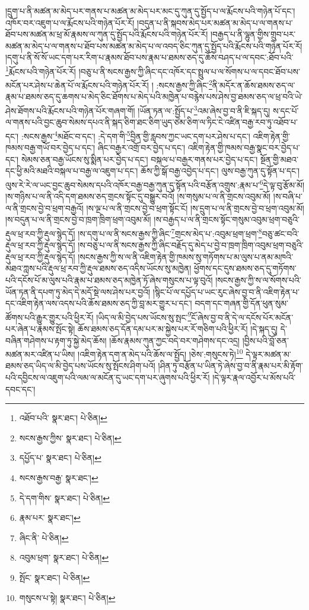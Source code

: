 །དྲུག་པ་ནི་མཚན་མ་མེད་པར་གནས་པ་མཚན་མ་མེད་པར་མང་དུ་ཀུན་དུ་སྤྱོད་པ་ལ་རྨོངས་པའི་གཉེན་པོ་དང་། འཁོར་བར་འཇུག་པ་ལ་རྨོངས་པའི་གཉེན་པོར་རོ། །བདུན་པ་ནི་སྐབས་མེད་པར་མཚན་མ་མེད་པ་ལ་གནས་པ་ཐོབ་པས་མཚན་མ་ཕྲ་མོ་རྣམས་ལ་ཀུན་དུ་སྤྱོད་པའི་རྨོངས་པའི་གཉེན་པོར་རོ། །བརྒྱད་པ་ནི་ལྷུན་གྱིས་གྲུབ་པར་མཚན་མ་མེད་པ་ལ་གནས་པ་ཐོབ་པས་མཚན་མ་མེད་པ་ལ་འབད་ཅིང་ཀུན་དུ་སྤྱོད་པའི་རྨོངས་པའི་གཉེན་པོར་རོ། །དགུ་པ་ནི་སོ་སོ་ཡང་དག་པར་རིག་པ་རྣམས་ཐོབ་པས་རྣམ་པ་ཐམས་ཅད་དུ་ཆོས་བཤད་པ་ལ་དབང་:ཐོབ་པའི་\footnote{འཐོབ་པའི་  སྣར་ཐང་།  པེ་ཅིན། }རྨོངས་པའི་གཉེན་པོར་རོ། །བཅུ་པ་ནི་སངས་རྒྱས་ཀྱི་ཞིང་དང་འཁོར་དང་སྤྲུལ་པ་ལ་སོགས་པ་ལ་དབང་ཐོབ་པས་མངོན་པར་ཤེས་པ་ཆེན་པོ་ལ་རྨོངས་པའི་གཉེན་པོར་རོ། །
:སངས་རྒྱས་ཀྱི་ཞིང་\footnote{སངས་རྒྱས་ཀྱིས་  སྣར་ཐང་།  པེ་ཅིན། }ནི་མདོར་ན་ཆོས་ཐམས་ཅད་ལ་རྣམ་པ་ཐམས་ཅད་དུ་ཆགས་པ་མེད་ཅིང་ཐོགས་པ་མེད་པའི་མཁྱེན་པ་བརྙེས་པས་ཤེས་བྱ་ཐམས་ཅད་ལ་ཕྲ་བའི་ཡེ་ཤེས་ཐོགས་པའི་རྨོངས་པའི་གཉེན་པོར་གཞག་གོ། །ཡོན་ཏན་ལ་:སྤྱོད་པ་\footnote{དཔྱོད་པ་  སྣར་ཐང་།  པེ་ཅིན། }འམ་ཞེས་བྱ་བ་ནི་ཇི་སྐད་དུ། ས་དང་པོ་ལ་གནས་པའི་བྱང་ཆུབ་སེམས་དཔའ་ནི་སྐད་ཅིག་ཐང་ཅིག་ཡུད་ཙམ་ཅིག་ལ་ཏིང་ངེ་འཛིན་བརྒྱ་རབ་ཏུ་འཐོབ་པ་དང་། :སངས་རྒྱས་\footnote{སངས་རྒྱས་བརྒྱ་  སྣར་ཐང་། }མཐོང་བ་དང་། :དེ་དག་གི་\footnote{དེ་དག་གིས་  སྣར་ཐང་།  པེ་ཅིན། }བྱིན་གྱི་རླབས་ཀྱང་ཡང་དག་པར་ཤེས་པ་དང་། འཇིག་རྟེན་གྱི་ཁམས་བརྒྱ་གཡོ་བར་བྱེད་པ་དང་། ཞིང་བརྒྱར་འགྲོ་བར་བྱེད་པ་དང་། འཇིག་རྟེན་གྱི་ཁམས་བརྒྱ་སྣང་བར་བྱེད་པ་དང་། སེམས་ཅན་བརྒྱ་ཡོངས་སུ་སྨིན་པར་བྱེད་པ་དང་། བསྐལ་པ་བརྒྱར་གནས་པར་བྱེད་པ་དང་། སྔོན་གྱི་མཐའ་དང་ཕྱི་མའི་མཐའི་བསྐལ་པ་བརྒྱ་ལ་འཇུག་པ་དང་། ཆོས་ཀྱི་སྒོ་བརྒྱ་འབྱེད་པ་དང་། ལུས་བརྒྱ་ཀུན་དུ་སྟོན་པ་དང་། ལུས་རེ་རེ་ལ་ཡང་བྱང་ཆུབ་སེམས་དཔའི་འཁོར་བརྒྱ་བརྒྱ་ཀུན་དུ་སྟོན་པའི་བརྩོན་འགྲུས་:རྣམ་པ་\footnote{རྣམ་པར་  སྣར་ཐང་། }དེ་ལྟ་བུ་རྩོམ་མོ། །ས་གཉིས་པ་ལ་ནི་འདི་དག་ཐམས་ཅད་གྲངས་སྟོང་དུ་བསྒྱུར་བའོ། །ས་གསུམ་པ་ལ་ནི་གྲངས་འབུམ་མོ། །ས་བཞི་པ་ལ་ནི་གྲངས་བྱེ་བ་ཕྲག་བརྒྱའོ། །ས་ལྔ་པ་ལ་ནི་གྲངས་བྱེ་བ་ཕྲག་སྟོང་ངོ། །ས་དྲུག་པ་ལ་ནི་གྲངས་བྱེ་བ་ཕྲག་འབུམ་མོ། །ས་བདུན་པ་ལ་ནི་གྲངས་བྱེ་བ་ཁྲག་ཁྲིག་ཕྲག་འབུམ་མོ། །ས་བརྒྱད་པ་ལ་ནི་གྲངས་སྟོང་གསུམ་འབུམ་ཕྲག་བཅུའི་རྡུལ་ཕྲ་རབ་ཀྱི་རྡུལ་སྙེད་དོ། །ས་དགུ་པ་ལ་ནི་སངས་རྒྱས་ཀྱི་ཞིང་\footnote{ཞིང་ནི་  པེ་ཅིན། }གྲངས་མེད་པ་:འབུམ་ཕྲག་ཕྲག་\footnote{འབུམ་ཕྲག་  སྣར་ཐང་།  པེ་ཅིན། }བཅུ་ཚང་བའི་རྡུལ་ཕྲ་རབ་ཀྱི་རྡུལ་སྙེད་དོ། །ས་བཅུ་པ་ལ་ནི་སངས་རྒྱས་ཀྱི་ཞིང་བརྗོད་དུ་མེད་པ་བྱེ་བ་ཁྲག་ཁྲིག་འབུམ་ཕྲག་བཅུའི་རྡུལ་ཕྲ་རབ་ཀྱི་རྡུལ་སྙེད་དོ། །སངས་རྒྱས་ཀྱི་ས་ལ་ནི་འཇིག་རྟེན་གྱི་ཁམས་སུ་གཏོགས་པ་མ་ལུས་པ་ནམ་མཁའི་མཐའ་ཀླས་པའི་རྡུལ་ཕྲ་རབ་ཀྱི་རྡུལ་ཐམས་ཅད་འདིས་ཡོངས་སུ་མཁྱེན། ཕྱོགས་དང་དུས་ཐམས་ཅད་དུ་གཏོགས་པའི་དངོས་པོ་མ་ལུས་པའི་རྣམ་པ་ཐམས་ཅད་མཁྱེན་ཏོ་ཞེས་གསུངས་པ་ལྟ་བུའོ། །སངས་རྒྱས་ཀྱི་ས་ལ་སོགས་པའི་ཡོན་ཏན་ནི་དཔག་ཏུ་མེད་དེ་མདོ་སྡེ་ལས་ཤེས་པར་བྱའོ། །སྙིང་པོ་ལ་དཔྱོད་པ་ཡང་རུང་ཞེས་བྱ་བ་ནི་འཇིག་རྟེན་པ་དང་འཇིག་རྟེན་ལས་འདས་པའི་ཆོས་ཐམས་ཅད་ཀྱི་བླ་མར་གྱུར་པ་དང་། བདག་དང་གཞན་གྱི་དོན་ཕུན་སུམ་ཚོགས་པའི་རྒྱུར་གྱུར་པའི་ཕྱིར་རོ། །ཡིད་ལ་མི་བྱེད་པས་ཡོངས་སུ་སྤང་\footnote{སྤོང་  སྣར་ཐང་།  པེ་ཅིན། }ངོ་ཞེས་བྱ་བ་ནི་དེ་ལ་དངོས་པོར་མངོན་པར་ཞེན་པ་རྣམས་སྤོང་སྟེ། ཆོས་ཐམས་ཅད་དོན་དམ་པར་མ་སྐྱེས་པར་རོ་གཅིག་པའི་ཕྱིར་རོ། །དེ་སྐད་དུ། དེ་བཞིན་གཤེགས་པ་རྟག་ཏུ་སྐྱེ་མེད་ཆོས། །ཆོས་རྣམས་ཀུན་ཀྱང་བདེ་བར་གཤེགས་དང་འདྲ། །བྱིས་པའི་བློ་ཅན་མཚན་མར་འཛིན་པ་ཡིས། །འཇིག་རྟེན་དག་ན་མེད་པའི་ཆོས་ལ་སྤྱོད། །ཅེས་:གསུངས་ཏེ།\footnote{གསུངས་པ་སྟེ།  སྣར་ཐང་།  པེ་ཅིན། } དེ་ལྟར་མཚན་མ་ཐམས་ཅད་ཡིད་ལ་མི་བྱེད་པས་ཡོངས་སུ་སྤོངས་ཤིག་པའོ། །ཤིན་ཏུ་བརྩོན་པ་ཡིན་ཏེ་ཞེས་བྱ་བ་ནི་རྣམ་པར་མི་རྟོག་པའི་དབྱིངས་ལ་འཇུག་པའི་ལམ་ལ་མངོན་དུ་ཡང་དག་པར་ཞུགས་པའི་ཕྱིར་རོ། །དེ་ལྟར་རྣལ་འབྱོར་པ་མོས་པའི་དབང་དང་། 